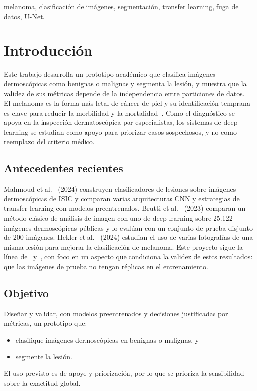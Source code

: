 \documentclass[conference]{IEEEtran}
\begin{document}
	\begin{IEEEkeywords}
		melanoma, clasificación de imágenes, segmentación, transfer learning, fuga de datos, U-Net.
	\end{IEEEkeywords}
	
	\section{Introducción}
	
	Este trabajo desarrolla un prototipo académico que clasifica imágenes dermoscópicas como benignas o malignas y segmenta la lesión, y muestra que la validez de sus métricas depende de la independencia entre particiones de datos. El melanoma es la forma más letal de cáncer de piel y su identificación temprana es clave para reducir la morbilidad y la mortalidad~\cite{mahmoud2024}. Como el diagnóstico se apoya en la inspección dermatoscópica por especialistas, los sistemas de deep learning se estudian como apoyo para priorizar casos sospechosos, y no como reemplazo del criterio médico.
	
	\subsection{Antecedentes recientes}
	
	Mahmoud et al.~\cite{mahmoud2024} (2024) construyen clasificadores de lesiones sobre imágenes dermoscópicas de ISIC y comparan varias arquitecturas CNN y estrategias de transfer learning con modelos preentrenados. Brutti et al.~\cite{brutti2023} (2023) comparan un método clásico de análisis de imagen con uno de deep learning sobre 25.122 imágenes dermoscópicas públicas y lo evalúan con un conjunto de prueba disjunto de 200 imágenes. Hekler et al.~\cite{hekler2024} (2024) estudian el uso de varias fotografías de una misma lesión para mejorar la clasificación de melanoma. Este proyecto sigue la línea de~\cite{mahmoud2024} y~\cite{brutti2023}, con foco en un aspecto que condiciona la validez de estos resultados: que las imágenes de prueba no tengan réplicas en el entrenamiento.
	
	\subsection{Objetivo}
	
	Diseñar y validar, con modelos preentrenados y decisiones justificadas por métricas, un prototipo que:
	\begin{itemize}
		\item clasifique imágenes dermoscópicas en benignas o malignas, y
		\item segmente la lesión.
	\end{itemize}
	El uso previsto es de apoyo y priorización, por lo que se prioriza la sensibilidad sobre la exactitud global.
	
\end{document}
